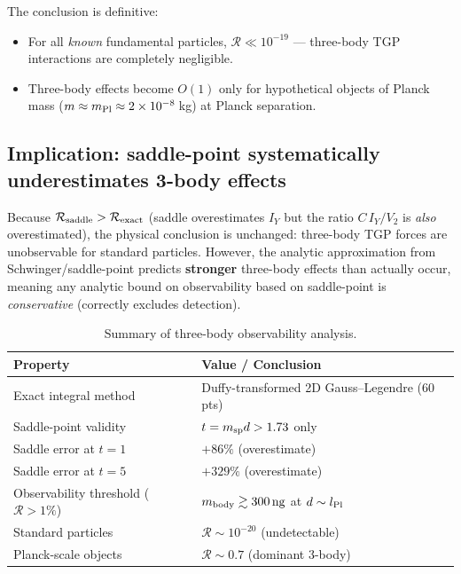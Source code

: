 \noindent
The conclusion is definitive:
\begin{itemize}
\item For all \emph{known} fundamental particles, $\mathcal{R}\ll10^{-19}$ —
  three-body TGP interactions are completely negligible.
\item Three-body effects become $O(1)$ only for hypothetical objects of
  Planck mass ($m\approx m_{\rm Pl}\approx2\times10^{-8}$\,kg) at Planck separation.
\end{itemize}

\subsection{Implication: saddle-point systematically underestimates 3-body effects}

Because $\mathcal{R}_{\rm saddle}>\mathcal{R}_{\rm exact}$ (saddle overestimates
$I_Y$ but the ratio $C\,I_Y/V_2$ is \emph{also} overestimated), the physical
conclusion is unchanged: three-body TGP forces are unobservable for standard
particles.  However, the analytic approximation from Schwinger/saddle-point
predicts \textbf{stronger} three-body effects than actually occur, meaning
any analytic bound on observability based on saddle-point is
\emph{conservative} (correctly excludes detection).

\begin{table}[h]
\centering
\caption{Summary of three-body observability analysis.}
\label{tab:ncrit_summary}
\begin{tabular}{ll}
\hline
Property & Value / Conclusion \\
\hline
Exact integral method & Duffy-transformed 2D Gauss--Legendre (60 pts) \\
Saddle-point validity & $t = m_{\rm sp}d > 1.73$ only \\
Saddle error at $t=1$ & $+86\%$ (overestimate) \\
Saddle error at $t=5$ & $+329\%$ (overestimate) \\
Observability threshold ($\mathcal{R}>1\%$) & $m_{\rm body} \gtrsim 300\,{\rm ng}$ at $d\sim l_{\rm Pl}$ \\
Standard particles & $\mathcal{R}\sim10^{-20}$ (undetectable) \\
Planck-scale objects & $\mathcal{R}\sim0.7$ (dominant 3-body) \\
\hline
\end{tabular}
\end{table}
